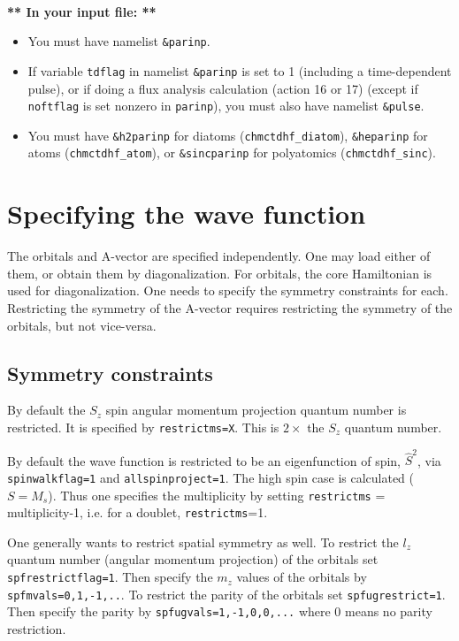 \documentclass[10pt,leqno, oneside]{book}
\begin{document}
\

{\large \textbf{** In your input file: **}}
\begin{itemize}
\item{You must have namelist \verb#&parinp#.}
\item{If variable \verb#tdflag# in namelist \verb#&parinp# is set to 1 (including a time-dependent pulse), or if doing a flux analysis calculation
(action 16 or 17) (except if \verb#noftflag# is set nonzero in \verb#parinp#), you must also have namelist \verb#&pulse#.}
\item{You must have \verb#&h2parinp# for diatoms (\verb#chmctdhf_diatom#), \verb#&heparinp# for atoms (\verb#chmctdhf_atom#), or 
\verb#&sincparinp# for polyatomics (\verb#chmctdhf_sinc#).}
\end{itemize}





\section{Specifying the wave function}

The orbitals and A-vector are specified independently.  One may load either of them, or obtain them by diagonalization.
For orbitals, the core Hamiltonian is used for diagonalization.  One needs to specify the symmetry constraints for each.
Restricting the symmetry of the A-vector requires restricting the symmetry of the orbitals, but not vice-versa.

\subsection{Symmetry constraints}


By default the $S_z$ spin angular momentum projection quantum number is restricted.  It is specified by \verb#restrictms=X#.  This is $2\times$ the $S_z$ quantum number.  

By default the wave function is restricted to be an eigenfunction of spin, $\hat{S}^2$, via \verb#spinwalkflag=1# and \verb#allspinproject=1#.  
The high spin case is calculated ($S=M_s$).  Thus one specifies the multiplicity by setting \verb#restrictms# = multiplicity-1, i.e. for a doublet, \verb#restrictms#=1.

One generally wants to restrict spatial symmetry as well.  
To restrict the $l_z$ quantum number (angular momentum projection) of the orbitals set \verb#spfrestrictflag=1#.  
Then specify the $m_z$ values of the orbitals by \verb#spfmvals=0,1,-1,..#.
To restrict the parity of the orbitals set \verb#spfugrestrict=1#.  Then specify the parity by \verb#spfugvals=1,-1,0,0,...#
where 0 means no parity restriction.  
\end{document}
